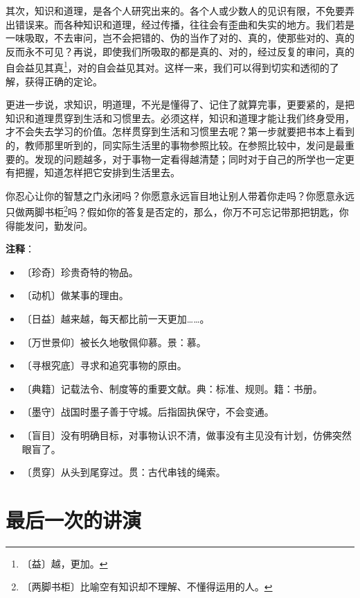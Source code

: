 \documentclass[12pt,UTF-8,openany]{ctexbook}
\begin{document}
\begin{large}
    其次，知识和道理，是各个人研究出来的。各个人或少数人的见识有限，不免要弄出错误来。而各种知识和道理，经过传播，往往会有歪曲和失实的地方。我们若是一味吸取，不去审问，岂不会把错的、伪的当作了对的、真的，使那些对的、真的反而永不可见？再说，即使我们所吸取的都是真的、对的，经过反复的审问，真的自会益见其真\footnote{〔益〕越，更加。}，对的自会益见其对。这样一来，我们可以得到切实和透彻的了解，获得正确的定论。
    
    更进一步说，求知识，明道理，不光是懂得了、记住了就算完事，更要紧的，是把知识和道理贯穿到生活和习惯里去。必须这样，知识和道理才能让我们终身受用，才不会失去学习的价值。怎样贯穿到生活和习惯里去呢？第一步就要把书本上看到的，教师那里听到的，同实际生活里的事物参照比较。在参照比较中，发问是最重要的。发现的问题越多，对于事物一定看得越清楚；同时对于自己的所学也一定更有把握，知道怎样把它安排到生活里去。
    
    你忍心让你的智慧之门永闭吗？你愿意永远盲目地让别人带着你走吗？你愿意永远只做两脚书柜\footnote{〔两脚书柜〕比喻空有知识却不理解、不懂得运用的人。}吗？假如你的答复是否定的，那么，你万不可忘记带那把钥匙，你得能发问，勤发问。
    
\end{large}


\newpage

\textbf{注释}：

\vspace{-1em}

\begin{itemize}
    \setlength\itemsep{-0.2em}
    \item 〔珍奇〕珍贵奇特的物品。
    \item 〔动机〕做某事的理由。
    \item 〔日益〕越来越，每天都比前一天更加……。
    \item 〔万世景仰〕被长久地敬佩仰慕。景：慕。
    \item 〔寻根究底〕寻求和追究事物的原由。
    \item 〔典籍〕记载法令、制度等的重要文献。典：标准、规则。籍：书册。
    \item 〔墨守〕战国时墨子善于守城。后指固执保守，不会变通。
    \item 〔盲目〕没有明确目标，对事物认识不清，做事没有主见没有计划，仿佛突然眼盲了。
    \item 〔贯穿〕从头到尾穿过。贯：古代串钱的绳索。
\end{itemize}

\chapter{最后一次的讲演}
\end{document}
